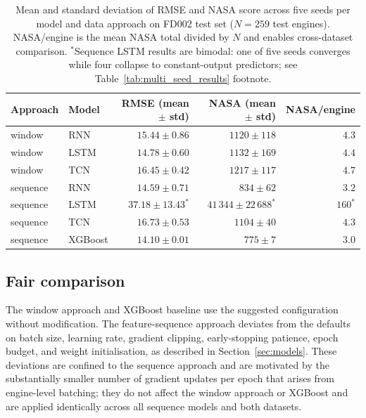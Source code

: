 \documentclass[a4paper,11pt]{article}
\begin{document}
\begin{table}[h]
    \centering
    \begin{tabular}{llrrr}
        \hline
        \textbf{Approach} & \textbf{Model} & \textbf{RMSE (mean $\pm$ std)} & \textbf{NASA (mean $\pm$ std)} & \textbf{NASA/engine} \\
        \hline
        window   & RNN     & $15.44 \pm 0.86$ & $1120 \pm 118$ & $4.3$ \\
        window   & LSTM    & $14.78 \pm 0.60$ & $1132 \pm 169$ & $4.4$ \\
        window   & TCN     & $16.45 \pm 0.42$ & $1217 \pm 117$ & $4.7$ \\
        sequence & RNN     & $14.59 \pm 0.71$ & $834 \pm 62$   & $3.2$ \\
        sequence & LSTM    & $37.18 \pm 13.43^{*}$ & $41\,344 \pm 22\,688^{*}$ & $160^{*}$ \\
        sequence & TCN     & $16.73 \pm 0.53$ & $1104 \pm 40$  & $4.3$ \\
        sequence & XGBoost & $14.10 \pm 0.01$ & $775 \pm 7$    & $3.0$ \\
        \hline
    \end{tabular}
    \caption{Mean and standard deviation of RMSE and NASA score across five seeds per model and data approach on FD002 test set ($N=259$ test engines). NASA/engine is the mean NASA total divided by $N$ and enables cross-dataset comparison. $^{*}$Sequence LSTM results are bimodal: one of five seeds converges while four collapse to constant-output predictors; see Table~\ref{tab:multi_seed_results} footnote.}
    \label{tab:multi_seed_results_fd002}
\end{table}

\subsection{Fair comparison}
The window approach and XGBoost baseline use the suggested configuration without modification.
The feature-sequence approach deviates from the defaults on batch size, learning rate, gradient clipping, early-stopping patience, epoch budget, and weight initialisation, as described in Section~\ref{sec:models}.
These deviations are confined to the sequence approach and are motivated by the substantially smaller number of gradient updates per epoch that arises from engine-level batching; they do not affect the window approach or XGBoost and are applied identically across all sequence models and both datasets.
\end{document}

